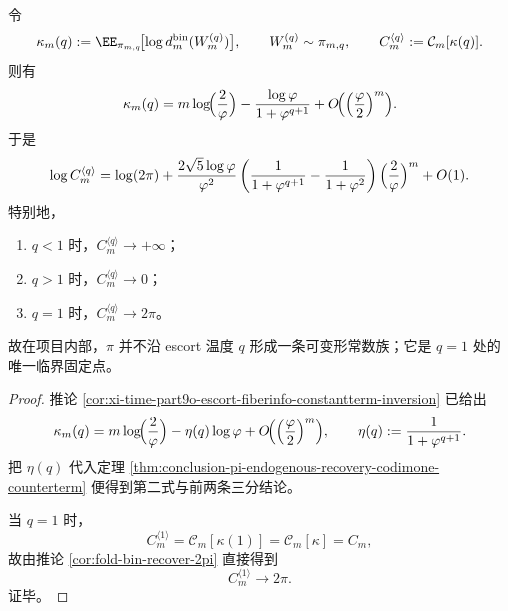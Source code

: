 \begin{corollary}[escort 温度族的 \texorpdfstring{$\pi$}{pi} 灾变：唯有 \texorpdfstring{$q=1$}{q=1} 存活]\label{cor:conclusion-escort-temperature-pi-catastrophe-q1-only}
令
\[
\kappa_m(q):=\EE_{\pi_{m,q}}\!\bigl[\log d_m^{\mathrm{bin}}(W_m^{(q)})\bigr],
\qquad
W_m^{(q)}\sim \pi_{m,q},
\qquad
C_m^{\langle q\rangle}:=\mathcal C_m[\kappa(q)].
\]
则有
\[
\kappa_m(q)
=
m\log\!\Bigl(\frac{2}{\varphi}\Bigr)-\frac{\log\varphi}{1+\varphi^{q+1}}
+O\!\Bigl(\Bigl(\frac{\varphi}{2}\Bigr)^m\Bigr).
\]
于是
\[
\log C_m^{\langle q\rangle}
=
\log(2\pi)
+
\frac{2\sqrt5\log\varphi}{\varphi^2}
\left(
\frac{1}{1+\varphi^{q+1}}-\frac{1}{1+\varphi^2}
\right)
\Bigl(\frac{2}{\varphi}\Bigr)^m
+O(1).
\]
特别地，
\begin{enumerate}
  \item \(q<1\) 时，\(C_m^{\langle q\rangle}\to+\infty\)；
  \item \(q>1\) 时，\(C_m^{\langle q\rangle}\to0\)；
  \item \(q=1\) 时，\(C_m^{\langle q\rangle}\to 2\pi\)。
\end{enumerate}
故在项目内部，\(\pi\) 并不沿 escort 温度 \(q\) 形成一条可变形常数族；它是 \(q=1\) 处的唯一临界固定点。
\end{corollary}
\begin{proof}
推论 \ref{cor:xi-time-part9o-escort-fiberinfo-constantterm-inversion} 已给出
\[
\kappa_m(q)
=
m\log\!\Bigl(\frac{2}{\varphi}\Bigr)-\eta(q)\log\varphi
+O\!\Bigl(\Bigl(\frac{\varphi}{2}\Bigr)^m\Bigr),
\qquad
\eta(q):=\frac{1}{1+\varphi^{q+1}}.
\]
把 \(\eta(q)\) 代入定理 \ref{thm:conclusion-pi-endogenous-recovery-codimone-counterterm} 便得到第二式与前两条三分结论。

当 \(q=1\) 时，
\[
C_m^{\langle 1\rangle}
=
\mathcal C_m[\kappa(1)]
=
\mathcal C_m[\kappa]
=
C_m,
\]
故由推论 \ref{cor:fold-bin-recover-2pi} 直接得到
\[
C_m^{\langle 1\rangle}\to 2\pi.
\]
证毕。
\end{proof}

